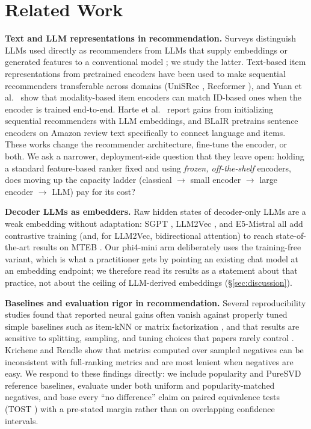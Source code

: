 \section{Related Work}
\label{sec:related-work}

\textbf{Text and LLM representations in recommendation.} Surveys
distinguish LLMs used directly as recommenders from LLMs that supply
embeddings or generated features to a conventional model
\cite{llm4rec-survey}; we study the latter. Text-based item
representations from pretrained encoders have been used to make
sequential recommenders transferable across domains (UniSRec
\cite{unisrec}, Recformer \cite{recformer}), and Yuan et
al.~\cite{yuan-id-vs-modality} show that modality-based item encoders
can match ID-based ones when the encoder is trained end-to-end. Harte et
al.~\cite{harte-llmseqrec} report gains from initializing sequential
recommenders with LLM embeddings, and BLaIR \cite{amazon-reviews-2023}
pretrains sentence encoders on Amazon review text specifically to
connect language and items. These works change the recommender
architecture, fine-tune the encoder, or both. We ask a narrower,
deployment-side question that they leave open: holding a standard
feature-based ranker fixed and using \emph{frozen, off-the-shelf}
encoders, does moving up the capacity ladder (classical
$\rightarrow$ small encoder $\rightarrow$ large encoder $\rightarrow$
LLM) pay for its cost?

\textbf{Decoder LLMs as embedders.} Raw hidden states of decoder-only
LLMs are a weak embedding without adaptation: SGPT \cite{sgpt},
LLM2Vec \cite{llm2vec}, and E5-Mistral \cite{e5-mistral} all add
contrastive training (and, for LLM2Vec, bidirectional attention) to
reach state-of-the-art results on MTEB \cite{mteb}. Our phi4-mini arm
deliberately uses the training-free variant, which is what a
practitioner gets by pointing an existing chat model at an embedding
endpoint; we therefore read its results as a statement about that
practice, not about the ceiling of LLM-derived embeddings
(\S\ref{sec:discussion}).

\textbf{Baselines and evaluation rigor in recommendation.} Several
reproducibility studies found that reported neural gains often vanish
against properly tuned simple baselines such as item-kNN or matrix
factorization \cite{dacrema-progress, rendle-ncf-mf}, and that results
are sensitive to splitting, sampling, and tuning choices that papers
rarely control \cite{sun-rigorous}. Krichene and Rendle
\cite{krichene-sampled} show that metrics computed over sampled
negatives can be inconsistent with full-ranking metrics and are most
lenient when negatives are easy. We respond to these findings directly:
we include popularity and PureSVD \cite{puresvd} reference baselines,
evaluate under both uniform and popularity-matched negatives, and base
every ``no difference'' claim on paired equivalence tests (TOST
\cite{tost}) with a pre-stated margin rather than on overlapping
confidence intervals.

